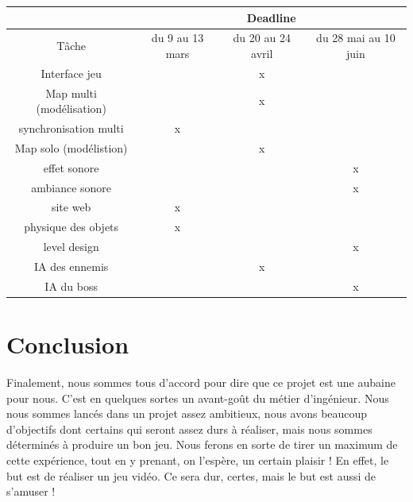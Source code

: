 \documentclass[12pt]{report}
\begin{document}
	\begin{tabular}{|*{4}{c|}}
	\hline
	& \multicolumn{3}{|c|}{Deadline}\\
	\hline
	Tâche & du 9 au 13 mars & du 20 au 24 avril & du 28 mai au 10 juin \\
	\hline
	Interface jeu & & x & \\
	\hline
	Map multi (modélisation) & & x & \\
	\hline
	synchronisation multi & x & & \\
	\hline
	Map solo (modélistion) & & x & \\
	\hline
	effet sonore & & & x \\
	\hline
	ambiance sonore & & & x \\
	\hline
	site web & x & & \\
	\hline 
	physique des objets & x & & \\
	\hline 
	level design & & & x \\
	\hline 
	IA des ennemis & & x & \\
	\hline
	IA du boss & & & x \\
	\hline
	
	\end{tabular}
\chapter{Conclusion}
	Finalement, nous sommes tous d'accord pour dire que ce projet est une aubaine pour nous. C'est en quelques sortes un avant-goût du métier d'ingénieur. 
Nous nous sommes lancés dans un projet assez ambitieux, nous avons beaucoup d'objectifs dont certains qui seront assez durs à réaliser, mais nous sommes déterminés à produire un bon jeu. Nous ferons en sorte de tirer un maximum de cette expérience, tout en y prenant, on l'espère, un certain plaisir ! En effet, le but est de réaliser un jeu vidéo. Ce sera dur, certes, mais le but est aussi de s'amuser ! 
	
\end{document}
